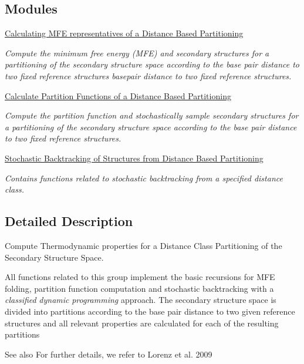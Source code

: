\subsection*{Modules}
\begin{DoxyCompactItemize}
\item 
\hyperlink{group__kl__neighborhood__mfe}{Calculating M\+F\+E representatives of a Distance Based Partitioning}
\begin{DoxyCompactList}\small\item\em Compute the minimum free energy (M\+FE) and secondary structures for a partitioning of the secondary structure space according to the base pair distance to two fixed reference structures basepair distance to two fixed reference structures. \end{DoxyCompactList}\item 
\hyperlink{group__kl__neighborhood__pf}{Calculate Partition Functions of a Distance Based Partitioning}
\begin{DoxyCompactList}\small\item\em Compute the partition function and stochastically sample secondary structures for a partitioning of the secondary structure space according to the base pair distance to two fixed reference structures. \end{DoxyCompactList}\item 
\hyperlink{group__kl__neighborhood__stochbt}{Stochastic Backtracking of Structures from Distance Based Partitioning}
\begin{DoxyCompactList}\small\item\em Contains functions related to stochastic backtracking from a specified distance class. \end{DoxyCompactList}\end{DoxyCompactItemize}


\subsection{Detailed Description}
Compute Thermodynamic properties for a Distance Class Partitioning of the Secondary Structure Space. 

All functions related to this group implement the basic recursions for M\+FE folding, partition function computation and stochastic backtracking with a {\itshape classified} {\itshape dynamic} {\itshape programming} approach. The secondary structure space is divided into partitions according to the base pair distance to two given reference structures and all relevant properties are calculated for each of the resulting partitions \begin{DoxySeeAlso}{See also}
For further details, we refer to Lorenz et al. 2009 \cite{lorenz:2009} 
\end{DoxySeeAlso}

